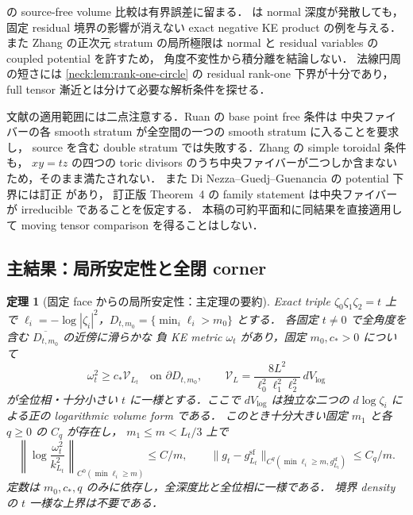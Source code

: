 \documentclass[a4paper,11pt]{ltjsarticle}
\numberwithin{equation}{section}
\theoremstyle{plain}
\newtheorem{theorem}{定理}[section]
\theoremstyle{definition}
\theoremstyle{remark}
\begin{document}
 の source-free volume 比較は有界誤差に留まる．
 は normal 深度が発散しても，
固定 residual 境界の影響が消えない exact negative KE product の例を与える．
また Zhang\cite[Lemma~3.3]{ZhangNegativeKE} の正次元 stratum の局所極限は
normal と residual variables の coupled potential を許すため，
角度不変性から積分離を結論しない．
法線円周の短さには \cref{neck:lem:rank-one-circle} の residual rank-one 下界が十分であり，
full tensor 漸近とは分けて必要な解析条件を探せる．

文献の適用範囲には二点注意する．Ruan\cite{RuanII} の base point free 条件は
中央ファイバーの各 smooth stratum が全空間の一つの smooth stratum に入ることを要求し，
source を含む double stratum では失敗する．Zhang の simple toroidal 条件も，
$xy=tz$ の四つの toric divisors のうち中央ファイバーが二つしか含まないため，そのまま満たされない．
また Di Nezza--Guedj--Guenancia の potential 下界には訂正\cite{DGGCorrection} があり，
訂正版 Theorem~4 の family statement は中央ファイバーが irreducible であることを仮定する．
本稿の可約平面和に同結果を直接適用して moving tensor comparison を得ることはしない．

\subsection{主結果：局所安定性と全閉 corner}

\begin{theorem}[固定 face からの局所安定性：主定理の要約]
\label{thm:local-stability-intro}
Exact triple $\zeta_0\zeta_1\zeta_2=t$ 上で
$\ell_i=-\log|\zeta_i|^2$，$D_{t,m_0}=\{\min_i\ell_i>m_0\}$ とする．
各固定 $t\ne0$ で全角度を含む $\overline{D_{t,m_0}}$ の近傍に滑らかな
負 KE metric $\omega_t$ があり，固定 $m_0,c_*>0$ について
\[
 \omega_t^2\ge c_*\mathcal V_{L_t}\quad\text{on }\partial D_{t,m_0},
 \qquad
 \mathcal V_L=\frac{8L^2}{\ell_0^2\ell_1^2\ell_2^2}\,dV_{\log}
\]
が全位相・十分小さい $t$ に一様とする．ここで $dV_{\log}$ は独立な二つの
$d\log\zeta_i$ による正の logarithmic volume form である．
このとき十分大きい固定 $m_1$ と各 $q\ge0$ の $C_q$ が存在し，
$m_1\le m<L_t/3$ 上で
\[
 \left\|\log\frac{\omega_t^2}{k_{L_t}^2}\right\|_{C^0(\min\ell_i\ge m)}
       \le C/m,
 \qquad
 \|g_t-g_{L_t}^{\mathrm{sf}}\|_{C^q(\min\ell_i\ge m,g_{L_t}^{\mathrm{sf}})}
       \le C_q/m.
\]
定数は $m_0,c_*,q$ のみに依存し，全深度比と全位相に一様である．
境界 density の $t$ 一様な上界は不要である．
\end{theorem}
\end{document}
